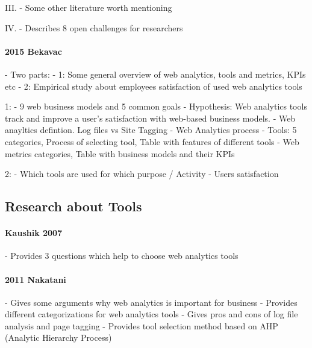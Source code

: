 III.
- Some other literature worth mentioning


IV.
- Describes 8 open challenges for researchers




\paragraph{2015 Bekavac}

- Two parts:
	- 1: Some general overview of web analytics, tools and metrics, KPIs etc
	- 2: Empirical study about employees satisfaction of used web analytics tools

1: 
- 9 web business models and 5 common goals
- Hypothesis: Web analytics tools track and improve a user’s satisfaction with web-based business models.
- Web anayltics defintion. Log files vs Site Tagging
- Web Analytics process
- Tools: 5 categories, Process of selecting tool, Table with features of different tools
- Web metrics categories, Table with business models and their KPIs

2:
- Which tools are used for which purpose / Activity
- Users satisfaction





\subsection{Research about Tools}



\paragraph{Kaushik 2007}
- Provides 3 questions which help to choose web analytics tools




\paragraph{2011 Nakatani}

- Gives some arguments why web analytics is important for business
- Provides different categorizations for web analytics tools
- Gives pros and cons of log file analysis and page tagging
- Provides tool selection method based on AHP (Analytic Hierarchy Process)

